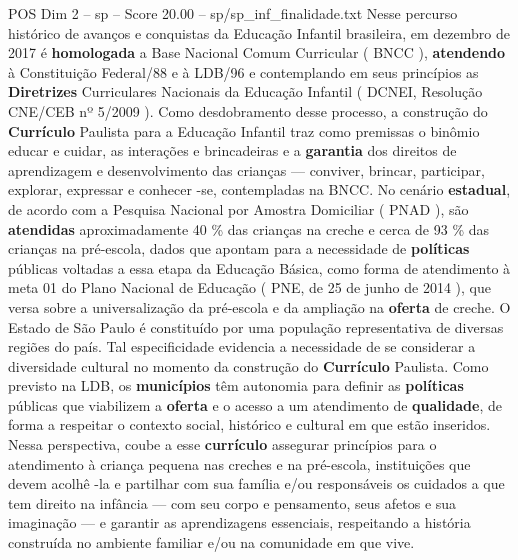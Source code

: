 \begin{textsample}{POS Dim 2 – sp – Score 20.00 – sp/sp\_inf\_finalidade.txt}
Nesse percurso histórico de avanços e conquistas da Educação Infantil brasileira, em dezembro de 2017 é \textbf{homologada} a Base Nacional Comum Curricular ( BNCC ), \textbf{atendendo} à Constituição Federal/88 e à LDB/96 e contemplando em seus princípios as \textbf{Diretrizes} Curriculares Nacionais da Educação Infantil ( DCNEI, Resolução CNE/CEB nº 5/2009 ).
Como desdobramento desse processo, a construção do \textbf{Currículo} Paulista para a Educação Infantil traz como premissas o binômio educar e cuidar, as interações e brincadeiras e a \textbf{garantia} dos direitos de aprendizagem e desenvolvimento das crianças — conviver, brincar, participar, explorar, expressar e conhecer -se, contempladas na BNCC.
No cenário \textbf{estadual}, de acordo com a Pesquisa Nacional por Amostra Domiciliar ( PNAD ), são \textbf{atendidas} aproximadamente 40 \% das crianças na creche e cerca de 93 \% das crianças na pré-escola, dados que apontam para a necessidade de \textbf{políticas} públicas voltadas a essa etapa da Educação Básica, como forma de atendimento à meta 01 do Plano Nacional de Educação ( PNE, de 25 de junho de 2014 ), que versa sobre a universalização da pré-escola e da ampliação na \textbf{oferta} de creche.
O Estado de São Paulo é constituído por uma população representativa de diversas regiões do país.
Tal especificidade evidencia a necessidade de se considerar a diversidade cultural no momento da construção do \textbf{Currículo} Paulista.
Como previsto na LDB, os \textbf{municípios} têm autonomia para definir as \textbf{políticas} públicas que viabilizem a \textbf{oferta} e o acesso a um atendimento de \textbf{qualidade}, de forma a respeitar o contexto social, histórico e cultural em que estão inseridos.
Nessa perspectiva, coube a esse \textbf{currículo} assegurar princípios para o atendimento à criança pequena nas creches e na pré-escola, instituições que devem acolhê -la e partilhar com sua família e/ou responsáveis os cuidados a que tem direito na infância — com seu corpo e pensamento, seus afetos e sua imaginação — e garantir as aprendizagens essenciais, respeitando a história construída no ambiente familiar e/ou na comunidade em que vive.

\end{textsample}
